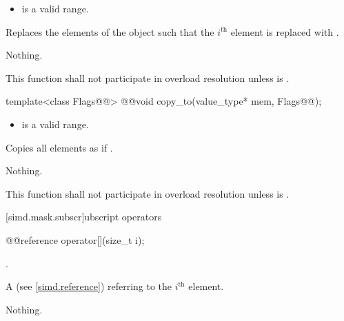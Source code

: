 \begin{itemdescr}
  \pnum\requires
  \begin{itemize}
    \item \tcode{[mem, mem + size())} is a valid range.
  \end{itemize}

  \pnum\effects
  Replaces the elements of the  object such that the $i^\text{th}$ element is replaced with  \foralli.

  \pnum\throws Nothing.

  \pnum\remarks
  This function shall not participate in overload resolution unless  is .

\end{itemdescr}

\begin{itemdecl}
template<class Flags@@> @@void copy_to(value_type* mem, Flags@\wgAdd{ = \{\}}@);
\end{itemdecl}

\begin{itemdescr}
  \pnum\requires
  \begin{itemize}
    \item \tcode{[mem, mem + size())} is a valid range.
  \end{itemize}

  \pnum\effects
  Copies all  elements as if  \foralli.

  \pnum\throws Nothing.

  \pnum\remarks
  This function shall not participate in overload resolution unless  is .
\end{itemdescr}

[simd.mask.subscr]{\texorpdfstring{ubscript}{simd_mask subscript} operators}

\begin{itemdecl}
@@reference operator[](size_t i);
\end{itemdecl}

\begin{itemdescr}
  \pnum\requires
  .

  \pnum\returns
  A  (see \ref{simd.reference}) referring to the $i^\text{th}$ element.

  \pnum\throws Nothing.
\end{itemdescr}

